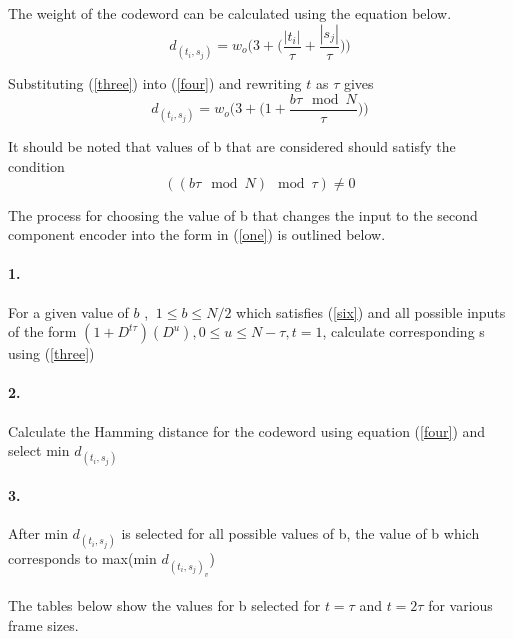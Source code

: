\documentclass[20 pts]{article}
\begin{document}
The weight of the codeword can be calculated using the equation below.
\begin{equation}
d_{(t_i,s_j)}=w_o\Bigg( 3+\Bigg( \frac{ \left|t_i\right|}{\tau} + 
\frac{ \left|s_j\right|}{\tau} \Bigg)\Bigg)
\label{four}
\end{equation}

Substituting (\ref{three}) into (\ref{four}) and rewriting $t$ as $\tau$ gives
\begin{equation}
d_{(t_i,s_j)}=w_o\Bigg( 3+\Bigg( 1+ \frac{ b\tau \mod N}{\tau} \Bigg)\Bigg)
\label{five}
\end{equation}

It should be noted that values of b that are considered should satisfy the condition
\begin{equation}
( (b\tau \mod N )\mod \tau ) \neq 0
\label{six}
\end{equation}

The process for choosing the value of b that changes the input to the second 
component encoder into the form in (\ref{one}) is outlined below.

\paragraph{1.} For a given value of $b$ , $\ 1 \leq b \leq N/2$ which 
satisfies (\ref{six}) and all possible inputs of the 
form $(1+D^{t\tau})(D^u) ,0\leq u\leq N-\tau, t=1$, 
calculate corresponding s using (\ref{three})
\paragraph{2.} Calculate the Hamming distance for the codeword using
 equation (\ref{four}) and select min $d_{(t_i,s_j)}$
\paragraph{3.}After min $d_{(t_i,s_j)}$ is selected for all possible values of b,
 the value of b which corresponds to max(min $d_{(t_i,s_j)_v}$)

\paragraph{}
The tables below show the values for b selected for $t=\tau$ and $t=2\tau$ for 
various frame sizes.
               
\end{document}
